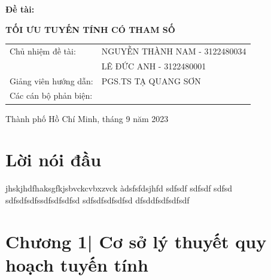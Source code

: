 \documentclass{article}
\begin{document}
\begin{titlepage}
\begin{center}
                \end{center}
                \begin{center}
                \hspace{15pt}\textbf{\fontsize{30pt}{0pt}\selectfont Đề tài:}
                \end{center}
                \begin{center}
                    \begin{center}
                \textbf{\fontsize{20pt}{0pt}\selectfont TỐI ƯU TUYẾN TÍNH CÓ THAM SỐ} 
                    \end{center}
                \vspace{1cm}
                \begin{table}[H]
                    \centering
                    \begin{tabular}{l l}
                \fontsize{14pt}{0pt}\selectfont Chủ nhiệm đề tài:     & \fontsize{14pt}{0pt}\selectfont NGUYỄN THÀNH NAM - 3122480034 \vspace{6pt}\\     
                  & \fontsize{14pt}{0pt}\selectfont LÊ ĐỨC ANH - 3122480001 \vspace{6pt}\\
                \fontsize{14pt}{0pt}\selectfont Giảng viên hướng dẫn: & \fontsize{14pt}{0pt}\selectfont PGS.TS TẠ QUANG SƠN \vspace{6pt}\\
                \fontsize{14pt}{0pt}\selectfont Các cán bộ phản biện:
                
               
                \end{tabular}
                \end{table}
                \vspace{0.5cm}
                \fontsize{14pt}{0pt}\selectfont Thành phố Hồ Chí Minh, tháng 9 năm 2023
                \end{center}
            \end{titlepage}
            \cleardoublepage
\tableofcontents
\section{Lời nói đầu}
jhskjhdfhaksgfkjsbvckcvbxzvck
àdsfsfdsjhfd
sdfsdf
sdfsdf
sdfsd\\
sdfsdfsdfssdfsdfsdfsd
sdfsdfsdfsdfsd
dfsddfsdfsdfsdf
\cleardoublepage
\section{Chương 1| Cơ sở lý thuyết quy hoạch tuyến tính}
\end{document}
